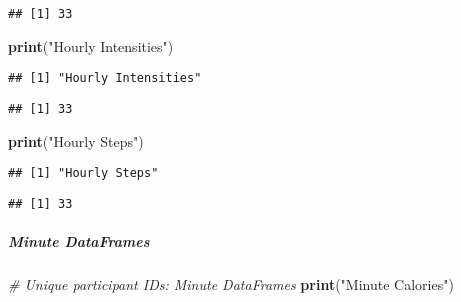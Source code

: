 \documentclass[
]{article}
\newenvironment{Shaded}{\begin{snugshade}}{\end{snugshade}}
\newcommand{\CommentTok}[1]{\textcolor[rgb]{0.56,0.35,0.01}{\textit{#1}}}
\newcommand{\FunctionTok}[1]{\textcolor[rgb]{0.13,0.29,0.53}{\textbf{#1}}}
\newcommand{\NormalTok}[1]{#1}
\newcommand{\SpecialCharTok}[1]{\textcolor[rgb]{0.81,0.36,0.00}{\textbf{#1}}}
\newcommand{\StringTok}[1]{\textcolor[rgb]{0.31,0.60,0.02}{#1}}
\begin{document}
\begin{verbatim}
## [1] 33
\end{verbatim}

\begin{Shaded}
\begin{Highlighting}[]
\FunctionTok{print}\NormalTok{(}\StringTok{"Hourly Intensities"}\NormalTok{)}
\end{Highlighting}
\end{Shaded}

\begin{verbatim}
## [1] "Hourly Intensities"
\end{verbatim}

\begin{Shaded}
\end{Shaded}

\begin{verbatim}
## [1] 33
\end{verbatim}

\begin{Shaded}
\begin{Highlighting}[]
\FunctionTok{print}\NormalTok{(}\StringTok{"Hourly Steps"}\NormalTok{)}
\end{Highlighting}
\end{Shaded}

\begin{verbatim}
## [1] "Hourly Steps"
\end{verbatim}

\begin{Shaded}
\end{Shaded}

\begin{verbatim}
## [1] 33
\end{verbatim}

\hypertarget{minute-dataframes-2}{%
\subparagraph{Minute DataFrames}\label{minute-dataframes-2}}

\begin{Shaded}
\begin{Highlighting}[]
\CommentTok{\# Unique participant IDs: Minute DataFrames}
\FunctionTok{print}\NormalTok{(}\StringTok{"Minute Calories"}\NormalTok{)}
\end{Highlighting}
\end{Shaded}
\end{document}
